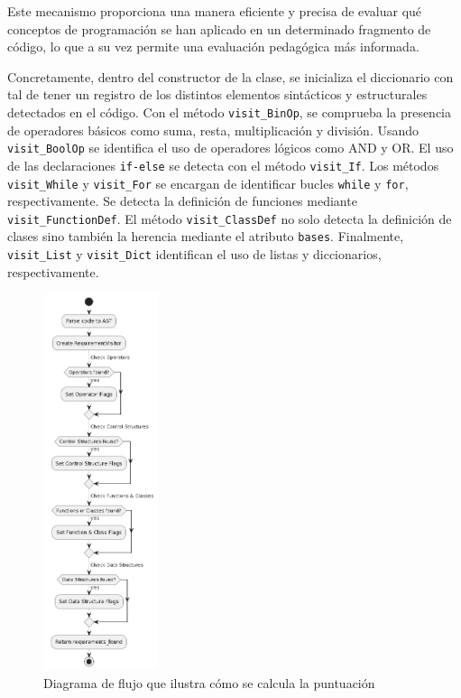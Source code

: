 Este mecanismo proporciona una manera eficiente y precisa de evaluar qué conceptos de programación se han aplicado en un determinado fragmento de código, lo que a su vez permite una evaluación pedagógica más informada. 

Concretamente, dentro del constructor de la clase, se inicializa el diccionario con tal de tener un registro de los distintos elementos sintácticos y estructurales detectados en el código.  Con el método \texttt{visit\_BinOp}, se comprueba la presencia de operadores básicos como suma, resta, multiplicación y división. Usando \texttt{visit\_BoolOp} se identifica el uso de operadores lógicos como AND y OR. El uso de las declaraciones \texttt{if-else} se detecta con el método \texttt{visit\_If}. Los métodos \texttt{visit\_While} y \texttt{visit\_For} se encargan de identificar bucles \texttt{while} y \texttt{for}, respectivamente. Se detecta la definición de funciones mediante \texttt{visit\_FunctionDef}. El método \texttt{visit\_ClassDef} no solo detecta la definición de clases sino también la herencia mediante el atributo \texttt{bases}. Finalmente, \texttt{visit\_List} y \texttt{visit\_Dict} identifican el uso de listas y diccionarios, respectivamente.

\begin{figure}[H]
    \centering
    \includegraphics[width=0.3\textwidth]{imagenes/comprobacionescodigo.png}
    \caption{Diagrama de flujo que ilustra cómo se calcula la puntuación}
    \label{fig:comprobaciones}
\end{figure}

